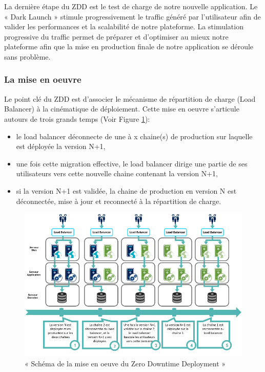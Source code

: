         La dernière étape du ZDD est le test de charge de notre nouvelle application. Le « Dark Launch » stimule progressivement le traffic généré par l’utilisateur afin de valider les performances et la scalabilité de notre plateforme. La stimulation progressive du traffic permet de préparer et d’optimiser au mieux notre plateforme afin que la mise en production finale de notre application se déroule sans problème.

        \subsubsection{La mise en oeuvre}
        Le point clé du ZDD est d'associer le mécanisme de répartition de charge (Load Balancer) à la cinématique de déploiement. Cette mise en oeuvre s'articule autours de trois grands temps (Voir Figure \ref{LoadBalancer}):\\
        \begin{itemize}
          \item le load balancer déconnecte de une à x chaine(s) de production sur laquelle est déployée la version N+1,
          \item une fois cette migration effective, le load balancer dirige une partie de ses utilisateurs vers cette nouvelle chaine contenant la version N+1,
          \item si la version N+1 est validée, la chaine de production en version N est déconnectée, mise à jour et reconnecté à la répartition de charge.\\
        \end{itemize}

        \begin{figure}
          \begin{center}
            \includegraphics[scale=0.6]{images/LoadBalancer.png}
          \end{center}
          \caption{« Schéma de la mise en oeuve du Zero Downtime Deployment »}
          \label{LoadBalancer}
        \end{figure}

